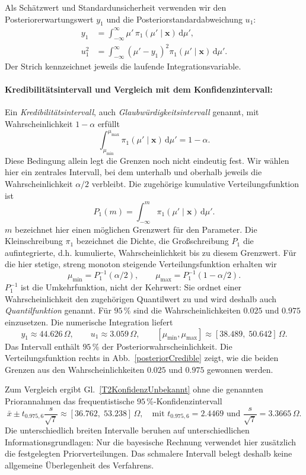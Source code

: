 Als Schätzwert und Standardunsicherheit verwenden wir den
Posteriorerwartungswert $y_1$ und die Posteriorstandardabweichung $u_1$:
\begin{align}
y_1&=\int_{-\infty}^{\infty}\mu'\,
     \pi_1(\mu'\mid\mathbf x)\,\mathrm d\mu',\\
u_1^2&=\int_{-\infty}^{\infty}(\mu'-y_1)^2
     \pi_1(\mu'\mid\mathbf x)\,\mathrm d\mu'.
\end{align}
Der Strich kennzeichnet jeweils die laufende Integrationsvariable.

\paragraph{Kredibilitätsintervall und Vergleich mit dem Konfidenzintervall:}
Ein \textsl{Kredibilitätsintervall}, auch
\textsl{Glaubwürdigkeitsintervall} genannt, mit Wahrscheinlichkeit
$1-\alpha$ erfüllt
\[
\int_{\mu_{\min}}^{\mu_{\max}}
\pi_1(\mu'\mid\mathbf x)\,\mathrm d\mu'=1-\alpha.
\]
Diese Bedingung allein legt die Grenzen noch nicht eindeutig fest.
Wir wählen hier ein zentrales Intervall, bei dem unterhalb und oberhalb
jeweils die Wahrscheinlichkeit $\alpha/2$ verbleibt.
Die zugehörige kumulative Verteilungsfunktion ist
\[
P_1(m)=\int_{-\infty}^{m}\pi_1(\mu'\mid\mathbf x)\,\mathrm d\mu'.
\]
$m$ bezeichnet hier einen möglichen Grenzwert für den Parameter.
Die Kleinschreibung $\pi_1$ bezeichnet die Dichte, die Großschreibung
$P_1$ die aufintegrierte, d.h. kumulierte, Wahrscheinlichkeit bis zu diesem Grenzwert.
Für die hier stetige, streng monoton steigende Verteilungsfunktion erhalten wir
\[
\mu_{\min}=P_1^{-1}(\alpha/2),\qquad
\mu_{\max}=P_1^{-1}(1-\alpha/2).
\]
$P_1^{-1}$ ist die Umkehrfunktion, nicht der Kehrwert: Sie ordnet
einer Wahrscheinlichkeit den zugehörigen Quantilwert zu und wird deshalb auch \textsl{Quantilfunktion} genannt.
Für $95\,\%$ sind die Wahrscheinlichkeiten $0.025$ und $0.975$
einzusetzen. Die numerische Integration liefert
\begin{equation}
y_1\approx44.626\,\Omega,\qquad
u_1\approx3.059\,\Omega,\qquad
[\mu_{\min},\mu_{\max}]
\approx[38.489,\;50.642]\,\Omega.
\label{T2BeispielErgebnis}
\end{equation}
Das Intervall enthält $95\,\%$ der Posteriorwahrscheinlichkeit.
Die Verteilungsfunktion rechts in Abb.~\ref{posteriorCredible} zeigt,
wie die beiden Grenzen aus den Wahrscheinlichkeiten $0.025$ und
$0.975$ gewonnen werden.

Zum Vergleich ergibt Gl.~\eqref{T2KonfidenzUnbekannt} ohne die genannten
Priorannahmen das frequentistische $95\,\%$-Konfidenz\-intervall
\begin{equation}
\bar x\pm t_{0.975,6}\frac{s}{\sqrt 7}
\approx[36.762,\;53.238]\,\Omega, \quad \text{mit } t_{0.975,6} = 2.4469  \text{ und  } \frac{s}{\sqrt 7} = 3.3665 \,\Omega.
\end{equation}
Die unterschiedlich breiten Intervalle beruhen auf unterschiedlichen
Informationsgrundlagen: Nur die bayesische Rechnung verwendet hier
zusätzlich die festgelegten Priorverteilungen. Das schmalere Intervall
belegt deshalb keine allgemeine Überlegenheit des Verfahrens.

